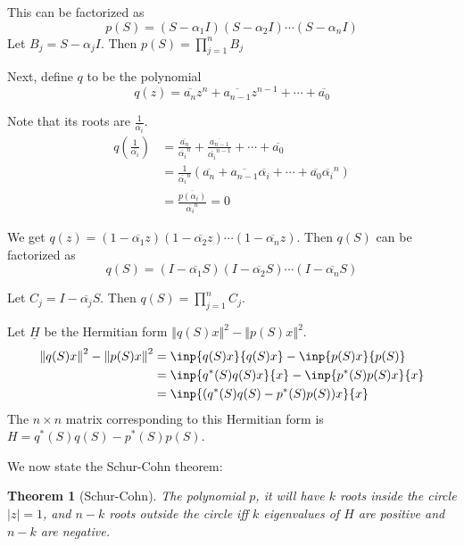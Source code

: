\documentclass[twofold]{article}
\newcommand*\conj[1]{\overline{#1}}
\newcommand*\adj[1]{#1^*}
\newcommand*\norm[1]{\left \Vert #1 \right\Vert}
\theoremstyle{plain}
\newtheorem{theorem}{Theorem}
\theoremstyle{definition}
\theoremstyle{remark}
\begin{document}
This can be factorized as \[p(S) = (S - \alpha_1I) (S - \alpha_2 I) \cdots (S - \alpha_n I)\] Let \(B_j = S - \alpha_jI\). Then \(p(S) =\displaystyle \prod_{j=1}^n B_j\)

Next, define \(q\) to be the polynomial 
\[q(z) = \conj{a_n}z^n + \conj{a_{n-1}}z^{n-1} + \cdots + \conj{a_0}\] 

Note that its roots are \(\frac {1}{\conj{\alpha_i}}\). 
\begin{equation*}\begin{split}
q \left(\frac{1}{\conj{\alpha_i}} \right) & = \frac{\conj{a_n}}{\conj{\alpha_i}^n} + \frac{\conj{a_{n-1}}}{\conj{\alpha_i}^{n-1}} + \cdots + \conj{a_0} \\
& = \frac{1}{\conj{\alpha_i}^n} (\conj{a_n} + \conj{a_{n-1}} \conj{\alpha_i} + \cdots + \conj{a_0} \conj{\alpha_i}^n) \\
& = \frac{\conj{p(\alpha_i)}}{\conj{\alpha_i}^n} = 0
\end{split}\end{equation*}

We get \(q(z) = (1 - \conj{\alpha_1}z) (1 - \conj{\alpha_2}z) \cdots (1 - \conj{\alpha_n}z)\). Then \(q(S)\) can be factorized as
\[q(S) = (I - \conj{\alpha_1}S) (I - \conj{\alpha_2}S) \cdots (I - \conj{\alpha_n}S)\]

 Let \(C_j= I -  \conj{\alpha_j} S\). Then \(q(S) =\displaystyle \prod_{j=1}^n C_j\).


Let \(\underline{H}\) be the Hermitian form \(\norm{ q(S) x }^2 - \norm{ p(S) x}^2\). 
\begin{equation*} \begin{split}
\norm{ q(S) x }^2 - \norm{ p(S) x}^2 &= \inp{q(S)x}{q(S)x} - \inp{p(S)x}{p(S)} \\
& = \inp{\adj{q}(S) q(S) x}{x} - \inp{\adj{p}(S) p(S) x}{x} \\
& = \inp{(\adj{q}(S) q(S) - \adj{p} (S) p(S) ) x}{x} \\
\end{split} \end{equation*}
The \(n \times n\) matrix corresponding to this Hermitian form is  \(H = \adj{q}(S) q(S) - \adj{p}(S) p(S)\).


We now state the Schur-Cohn theorem:

\begin{theorem} [Schur-Cohn] The polynomial \(p\), it will have \(k\) roots inside the circle \(|z| = 1\), and \(n-k\) roots outside the circle iff \(k\) eigenvalues of \(H\) are positive and \(n-k\) are negative. \end{theorem}
\end{document}
